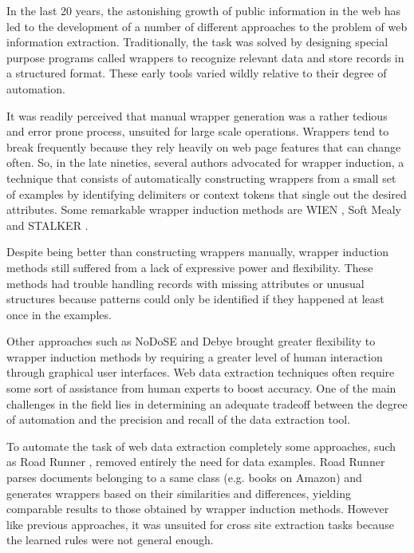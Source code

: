 \documentclass[sigconf]{acmart}
\begin{document}
In the last 20 years, the astonishing growth of public information in the web has 
led to the development of a number of different approaches to the problem of web 
information extraction. Traditionally, the task was solved by designing special purpose
programs called wrappers to recognize relevant data and store records in a structured
format. These early tools varied wildly relative to their degree of automation. 

It was readily perceived that manual wrapper generation was a rather tedious and
error prone process, unsuited for large scale operations. Wrappers tend to
break frequently because they rely heavily on web page features that can change 
often. So, in the late nineties, several authors advocated for wrapper induction, a technique 
that consists of automatically constructing wrappers from a small set of examples by 
identifying delimiters or context tokens that single out the desired attributes. 
Some remarkable wrapper induction methods are WIEN \cite{Kushmerick2000}, Soft 
Mealy \cite{Hsu1998} and STALKER \cite{Muslea1999}.

Despite being better than constructing wrappers manually, wrapper induction methods 
still suffered from a lack of expressive power and flexibility. These methods had 
trouble handling records with missing attributes or unusual structures because
patterns could only be identified if they happened at least once in the examples.

Other approaches such as NoDoSE \cite{Adelberg1998} and Debye \cite{Laender2002a} 
brought greater flexibility to wrapper induction methods by requiring a greater level 
of human interaction through graphical user interfaces. Web data extraction techniques often 
require some sort of assistance from human experts to boost accuracy. One of the main challenges 
in the field lies in determining an adequate tradeoff between the degree of automation and 
the precision and recall of the data extraction tool.

To automate the task of web data extraction completely some approaches,
such as Road Runner \cite{Crescenzi2001}, removed entirely the need for data examples.
Road Runner parses documents belonging to a same class (e.g. books on Amazon) and 
generates wrappers based on their similarities and differences, yielding comparable results 
to those obtained by wrapper induction methods. However like previous approaches, it was 
unsuited for cross site extraction tasks because the learned rules were not general enough.
\end{document}
